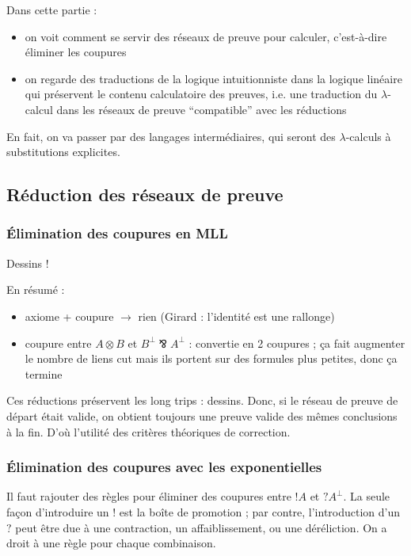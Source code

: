 \documentclass[a4paper, 11pt]{article}
\newcommand{\parr}{\mathbin{⅋}}
\newcommand{\ofcourse}{\mathord{!}}
\newcommand{\whynot}{\mathord{?}}
\begin{document}
\newcommand{\lambdas}{{\lambda \mathtt{s}}}
\newcommand{\lambdalxr}{{\lambda \mathtt{l x r}}}

Dans cette partie :
\begin{itemize}
\item on voit comment se servir des réseaux de preuve pour calculer, c'est-à-dire éliminer les coupures
\item on regarde des traductions de la logique intuitionniste dans la logique linéaire qui préservent le contenu calculatoire des preuves, i.e. une traduction du $\lambda$-calcul dans les réseaux de preuve \enquote{compatible} avec les réductions
\end{itemize}

En fait, on va passer par des langages intermédiaires, qui seront des $\lambda$-calculs à substitutions explicites.

\subsection{Réduction des réseaux de preuve}

\subsubsection{Élimination des coupures en MLL}

Dessins !

En résumé :
\begin{itemize}
\item axiome + coupure $\to$ rien (Girard : l'identité est une rallonge)
\item coupure entre $A \otimes B$ et $B^\perp \parr A^\perp$ : convertie en 2 coupures ; ça fait augmenter le nombre de liens cut mais ils portent sur des formules plus petites, donc ça termine
\end{itemize}

Ces réductions préservent les long trips : dessins. Donc, si le réseau de preuve de départ était valide, on obtient toujours une preuve valide des mêmes conclusions à la fin. D'où l'utilité des critères théoriques de correction.

\subsubsection{Élimination des coupures avec les exponentielles}

Il faut rajouter des règles pour éliminer des coupures entre $\ofcourse A$ et $\whynot A^\perp$. La seule façon d'introduire un $\ofcourse$ est la boîte de promotion ; par contre, l'introduction d'un $\whynot$ peut être due à une contraction, un affaiblissement, ou une déréliction. On a droit à une règle pour chaque combinaison.
\end{document}
